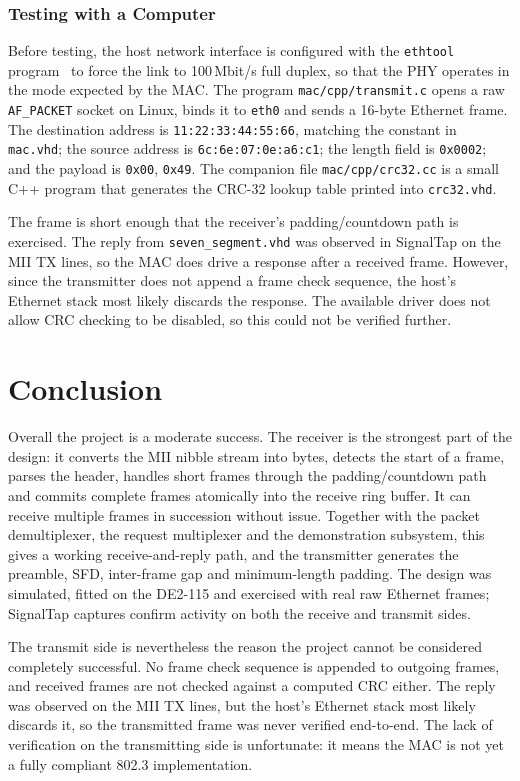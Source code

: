 \documentclass[11pt,a4paper]{article}
\begin{document}
\subsubsection{Testing with a Computer}
Before testing, the host network interface is configured with the \texttt{ethtool} program~\cite{ethtool} to force the link to 100\,Mbit/s full duplex, so that the PHY operates in the mode expected by the MAC. The program \texttt{mac/cpp/transmit.c} opens a raw \texttt{AF\_PACKET} socket on Linux, binds it to \texttt{eth0} and sends a 16-byte Ethernet frame. The destination address is \texttt{11:22:33:44:55:66}, matching the constant in \texttt{mac.vhd}; the source address is \texttt{6c:6e:07:0e:a6:c1}; the length field is \texttt{0x0002}; and the payload is \texttt{0x00}, \texttt{0x49}. The companion file \texttt{mac/cpp/crc32.cc} is a small C++ program that generates the CRC-32 lookup table printed into \texttt{crc32.vhd}.

The frame is short enough that the receiver's padding/countdown path is exercised. The reply from \texttt{seven\_segment.vhd} was observed in SignalTap on the MII TX lines, so the MAC does drive a response after a received frame. However, since the transmitter does not append a frame check sequence, the host's Ethernet stack most likely discards the response. The available driver does not allow CRC checking to be disabled, so this could not be verified further.

\newpage

\section{Conclusion}
Overall the project is a moderate success. The receiver is the strongest part of the design: it converts the MII nibble stream into bytes, detects the start of a frame, parses the header, handles short frames through the padding/countdown path and commits complete frames atomically into the receive ring buffer. It can receive multiple frames in succession without issue. Together with the packet demultiplexer, the request multiplexer and the demonstration subsystem, this gives a working receive-and-reply path, and the transmitter generates the preamble, SFD, inter-frame gap and minimum-length padding. The design was simulated, fitted on the DE2-115 and exercised with real raw Ethernet frames; SignalTap captures confirm activity on both the receive and transmit sides.

The transmit side is nevertheless the reason the project cannot be considered completely successful. No frame check sequence is appended to outgoing frames, and received frames are not checked against a computed CRC either. The reply was observed on the MII TX lines, but the host's Ethernet stack most likely discards it, so the transmitted frame was never verified end-to-end. The lack of verification on the transmitting side is unfortunate: it means the MAC is not yet a fully compliant 802.3 implementation.
\end{document}
